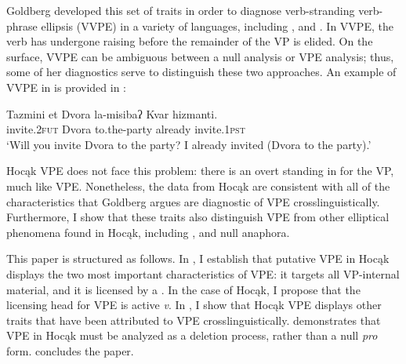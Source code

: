 \documentclass[output=paper]{LSP/langsci}
\begin{document}
Goldberg developed this set of traits in order to diagnose verb-stranding verb-phrase ellipsis (VVPE) in a variety of languages, including ,  and . In VVPE, the verb has undergone raising before the remainder of the VP is elided. On the surface, VVPE can be ambiguous between a null  analysis or VPE analysis; thus, some of her diagnostics serve to distinguish these two approaches. An example of VVPE in  is provided in :
 
\ea\label{ex:johnson:2}
\gll Tazmini {et Dvora} la-misibaʔ Kvar hizmanti.\\
invite.\textsc{2fut} Dvora to.the-party already invite.\textsc{1pst}\\
\trans `Will you invite Dvora to the party? I already invited (Dvora to the party).' \\\citep[14]{Goldberg2005}
\z 

 
Hocąk VPE does not face this problem: there is an overt  standing in for the VP, much like  VPE. Nonetheless, the data from Hocąk are consistent with all of the characteristics that Goldberg argues are diagnostic of VPE crosslinguistically. Furthermore, I show that these traits also distinguish VPE from other elliptical phenomena found in Hocąk, including ,  and null  anaphora. 

This paper is structured as follows. In , I establish that putative VPE in Hocąk displays the two most important characteristics of VPE: it targets all VP-internal material, and it is licensed by a . In the case of Hocąk, I propose that the licensing head for VPE is active \emph{v}. In , I show that Hocąk VPE displays other traits that have been attributed to VPE crosslinguistically.  demonstrates that VPE in Hocąk must be analyzed as a deletion process, rather than a null \emph{pro} form.  concludes the paper.
 
\end{document}
